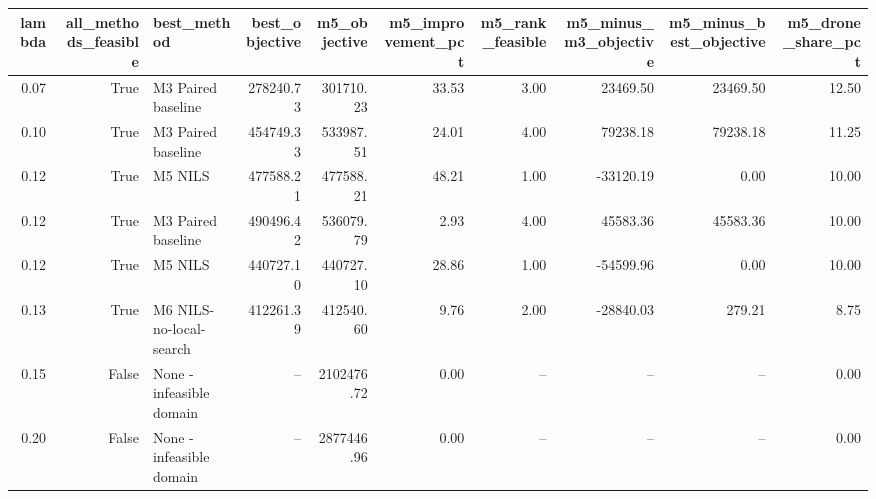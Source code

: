 \begin{tabular}{rrlrrrrrrr}
\toprule
lambda & all_methods_feasible & best_method & best_objective & m5_objective & m5_improvement_pct & m5_rank_feasible & m5_minus_m3_objective & m5_minus_best_objective & m5_drone_share_pct \\
\midrule
0.07 & True & M3 Paired baseline & 278240.73 & 301710.23 & 33.53 & 3.00 & 23469.50 & 23469.50 & 12.50 \\
0.10 & True & M3 Paired baseline & 454749.33 & 533987.51 & 24.01 & 4.00 & 79238.18 & 79238.18 & 11.25 \\
0.12 & True & M5 NILS & 477588.21 & 477588.21 & 48.21 & 1.00 & -33120.19 & 0.00 & 10.00 \\
0.12 & True & M3 Paired baseline & 490496.42 & 536079.79 & 2.93 & 4.00 & 45583.36 & 45583.36 & 10.00 \\
0.12 & True & M5 NILS & 440727.10 & 440727.10 & 28.86 & 1.00 & -54599.96 & 0.00 & 10.00 \\
0.13 & True & M6 NILS-no-local-search & 412261.39 & 412540.60 & 9.76 & 2.00 & -28840.03 & 279.21 & 8.75 \\
0.15 & False & None - infeasible domain & -- & 2102476.72 & 0.00 & -- & -- & -- & 0.00 \\
0.20 & False & None - infeasible domain & -- & 2877446.96 & 0.00 & -- & -- & -- & 0.00 \\
\bottomrule
\end{tabular}
